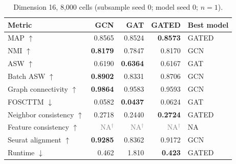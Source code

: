 \documentclass[10pt]{article}
\begin{document}
\begin{table}[H]\centering\small
\caption{Dimension 16, 8,000 cells (subsample seed 0; model seed 0; $n=1$).}
\begin{tabular}{@{}lrrrl@{}}\toprule
Metric & GCN & GAT & GATED & Best model \\\midrule
MAP $\uparrow$ & 0.8565 & 0.8524 & \textbf{0.8573} & GATED \\
NMI $\uparrow$ & \textbf{0.8179} & 0.7847 & 0.8170 & GCN \\
ASW $\uparrow$ & 0.6190 & \textbf{0.6364} & 0.6167 & GAT \\
Batch ASW $\uparrow$ & \textbf{0.8902} & 0.8331 & 0.8706 & GCN \\
Graph connectivity $\uparrow$ & \textbf{0.9864} & 0.9583 & 0.9593 & GCN \\
FOSCTTM $\downarrow$ & 0.0582 & \textbf{0.0437} & 0.0624 & GAT \\
Neighbor consistency $\uparrow$ & 0.2718 & 0.2440 & \textbf{0.2724} & GATED \\
Feature consistency $\uparrow$ & \textcolor{gray}{NA$^{\dagger}$} & \textcolor{gray}{NA$^{\dagger}$} & \textcolor{gray}{NA$^{\dagger}$} & NA \\
Seurat alignment $\uparrow$ & \textbf{0.9285} & 0.8362 & 0.9172 & GCN \\
Runtime $\downarrow$ & 0.462 & 1.810 & \textbf{0.423} & GATED \\
\bottomrule\end{tabular}
\end{table}
\end{document}
